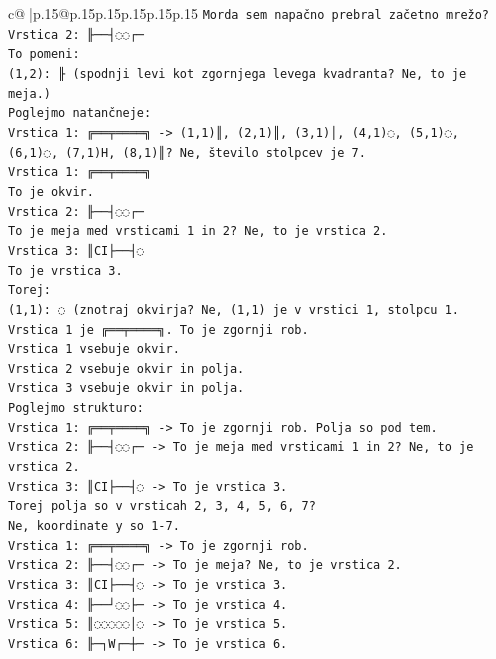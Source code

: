 \documentclass{article}
\begin{document}
{\begin{supertabular}{c@{$\;$}|p{.15\linewidth}@{}p{.15\linewidth}p{.15\linewidth}p{.15\linewidth}p{.15\linewidth}p{.15\linewidth}}
{{{\texttt{Morda sem napačno prebral začetno mrežo?} \\
\texttt{Vrstica 2: ╟──┤◌◌┌─} \\
\texttt{To pomeni:} \\
\texttt{(1,2): ╟ (spodnji levi kot zgornjega levega kvadranta? Ne, to je meja.)} \\
\texttt{Poglejmo natančneje:} \\
\texttt{Vrstica 1: ╔══╤════╗ {-}> (1,1)║, (2,1)║, (3,1)│, (4,1)◌, (5,1)◌, (6,1)◌, (7,1)H, (8,1)║? Ne, število stolpcev je 7.} \\
\texttt{Vrstica 1: ╔══╤════╗} \\
\texttt{To je okvir.} \\
\texttt{Vrstica 2: ╟──┤◌◌┌─} \\
\texttt{To je meja med vrsticami 1 in 2? Ne, to je vrstica 2.} \\
\texttt{Vrstica 3: ║CI├──┤◌} \\
\texttt{To je vrstica 3.} \\
\texttt{Torej:} \\
\texttt{(1,1): ◌ (znotraj okvirja? Ne, (1,1) je v vrstici 1, stolpcu 1. Vrstica 1 je ╔══╤════╗. To je zgornji rob.} \\
\texttt{Vrstica 1 vsebuje okvir.} \\
\texttt{Vrstica 2 vsebuje okvir in polja.} \\
\texttt{Vrstica 3 vsebuje okvir in polja.} \\
\texttt{Poglejmo strukturo:} \\
\texttt{Vrstica 1: ╔══╤════╗ {-}> To je zgornji rob. Polja so pod tem.} \\
\texttt{Vrstica 2: ╟──┤◌◌┌─ {-}> To je meja med vrsticami 1 in 2? Ne, to je vrstica 2.} \\
\texttt{Vrstica 3: ║CI├──┤◌ {-}> To je vrstica 3.} \\
\texttt{Torej polja so v vrsticah 2, 3, 4, 5, 6, 7?} \\
\texttt{Ne, koordinate y so 1{-}7.} \\
\texttt{Vrstica 1: ╔══╤════╗ {-}> To je zgornji rob.} \\
\texttt{Vrstica 2: ╟──┤◌◌┌─ {-}> To je meja? Ne, to je vrstica 2.} \\
\texttt{Vrstica 3: ║CI├──┤◌ {-}> To je vrstica 3.} \\
\texttt{Vrstica 4: ╟──┘◌◌├─ {-}> To je vrstica 4.} \\
\texttt{Vrstica 5: ║◌◌◌◌◌│◌ {-}> To je vrstica 5.} \\
\texttt{Vrstica 6: ╟─┐W┌─┼─ {-}> To je vrstica 6.} \\
}}}
\end{supertabular}}
\end{document}
